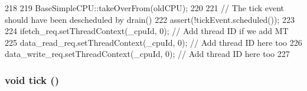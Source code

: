 \begin{DoxyCode}
218 {
219     BaseSimpleCPU::takeOverFrom(oldCPU);
220 
221     // The tick event should have been descheduled by drain()
222     assert(!tickEvent.scheduled());
223 
224     ifetch_req.setThreadContext(_cpuId, 0); // Add thread ID if we add MT
225     data_read_req.setThreadContext(_cpuId, 0); // Add thread ID here too
226     data_write_req.setThreadContext(_cpuId, 0); // Add thread ID here too
227 }
\end{DoxyCode}
\hypertarget{classAtomicSimpleCPU_a873dd91783f9efb4a590aded1f70d6b0}{
\subsubsection[{tick}]{\setlength{\rightskip}{0pt plus 5cm}void tick ()}}
\label{classAtomicSimpleCPU_a873dd91783f9efb4a590aded1f70d6b0}



